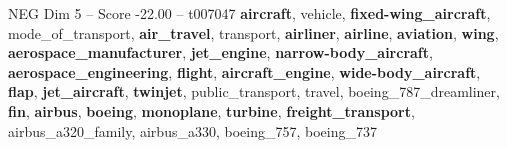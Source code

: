 \begin{textsample}{NEG Dim 5 – Score -22.00 – t007047}  \label{ex:f5_neg_009}
\textbf{aircraft}, vehicle, \textbf{fixed-wing\_aircraft}, mode\_of\_transport, \textbf{air\_travel}, transport, \textbf{airliner}, \textbf{airline}, \textbf{aviation}, \textbf{wing}, \textbf{aerospace\_manufacturer}, \textbf{jet\_engine}, \textbf{narrow-body\_aircraft}, \textbf{aerospace\_engineering}, \textbf{flight}, \textbf{aircraft\_engine}, \textbf{wide-body\_aircraft}, \textbf{flap}, \textbf{jet\_aircraft}, \textbf{twinjet}, public\_transport, travel, boeing\_787\_dreamliner, \textbf{fin}, \textbf{airbus}, \textbf{boeing}, \textbf{monoplane}, \textbf{turbine}, \textbf{freight\_transport}, airbus\_a320\_family, airbus\_a330, boeing\_757, boeing\_737

\end{textsample}
